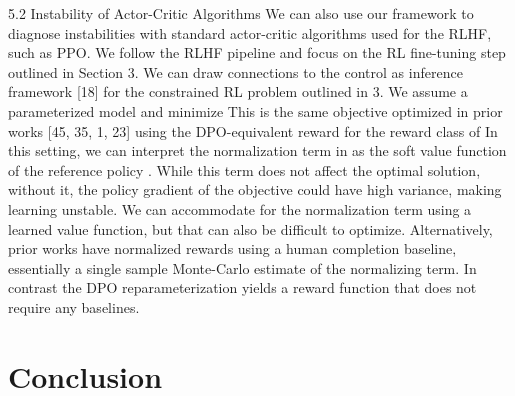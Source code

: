 \documentclass[a4paper, 12pt]{article}
\begin{document}
5.2 Instability of Actor-Critic Algorithms
We can also use our framework to diagnose instabilities with standard actor-critic algorithms used
for the RLHF, such as PPO. We follow the RLHF pipeline and focus on the RL fine-tuning step
outlined in Section 3. We can draw connections to the control as inference framework [18] for the
constrained RL problem outlined in 3. We assume a parameterized model and minimize
This is the same objective optimized in prior works [45, 35, 1, 23] using the DPO-equivalent reward
for the reward class of In this setting, we can interpret the normalization term in 
as the soft value function of the reference policy . While this term does not affect the optimal
solution, without it, the policy gradient of the objective could have high variance, making learning
unstable. We can accommodate for the normalization term using a learned value function, but that
can also be difficult to optimize. Alternatively, prior works have normalized rewards using a human
completion baseline, essentially a single sample Monte-Carlo estimate of the normalizing term. In
contrast the DPO reparameterization yields a reward function that does not require any baselines.

\section{Conclusion}\label{sec:Conclusion}




\end{document}
